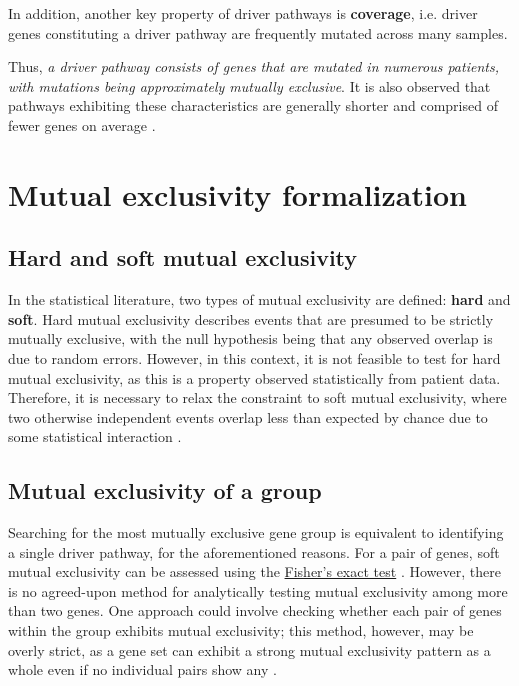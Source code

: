 In addition, another key property of driver pathways is \textbf{coverage}, i.e. driver genes constituting a driver pathway are frequently mutated across many samples. 

Thus, \textit{a driver pathway consists of genes that are mutated in numerous patients, with mutations being approximately mutually exclusive}. It is also observed that pathways exhibiting these characteristics are generally shorter and comprised of fewer genes on average \cite{multi-dendrix}.

\section{Mutual exclusivity formalization}

\subsection{Hard and soft mutual exclusivity}

In the statistical literature, two types of mutual exclusivity are defined: \textbf{hard} and \textbf{soft}. Hard mutual exclusivity describes events that are presumed to be strictly mutually exclusive, with the null hypothesis being that any observed overlap is due to random errors. However, in this context, it is not feasible to test for hard mutual exclusivity, as this is a property observed statistically from patient data. Therefore, it is necessary to relax the constraint to soft mutual exclusivity, where two otherwise independent events overlap less than expected by chance due to some statistical interaction \cite{mutex}.

\subsection{Mutual exclusivity of a group}

Searching for the most mutually exclusive gene group is equivalent to identifying a single driver pathway, for the aforementioned reasons. For a pair of genes, soft mutual exclusivity can be assessed using the \href{https://en.wikipedia.org/wiki/Fisher\%27s_exact_test}{Fisher's exact test} . However, there is no agreed-upon method for analytically testing mutual exclusivity among more than two genes. One approach could involve checking whether each pair of genes within the group exhibits mutual exclusivity; this method, however, may be overly strict, as a gene set can exhibit a strong mutual exclusivity pattern as a whole even if no individual pairs show any \cite{mutex}.

